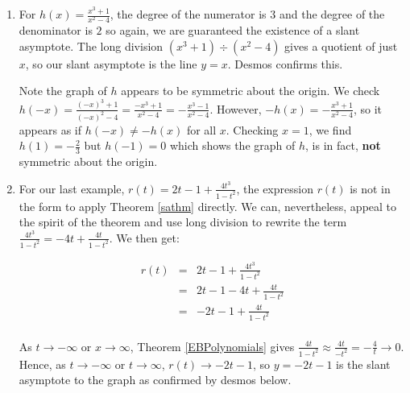 \documentclass{ximera}
\begin{document}
\begin{example}
\begin{explanation}
\begin{enumerate}
so we have that the slant asymptote $y=t+2$ is identical to the graph of $y=g(t)$ except at $t=2$ (where the latter has a `hole' at $(2,4)$.) While the word `asymptote' has the connotation of `approaching but not equaling,' Definitions \ref{ha} and  \ref{sa} allow for these extreme cases.

\begin{center}
\end{center} 

\item   For $h(x) = \frac{x^3+1}{x^2-4}$, the degree of the numerator is $3$ and the degree of the denominator is $2$ so again, we are guaranteed the existence of a slant asymptote.  The long division $\left(x^3+1 \right) \div \left(x^2-4\right)$ gives a quotient of just $x$, so our slant asymptote is the line $y=x$.  Desmos confirms this.  

\begin{center}
\end{center} 


Note the graph of $h$ appears to be symmetric about the origin.  We check $h(-x) = \frac{(-x)^3+1}{(-x)^2-4} = \frac{-x^3+1}{x^2-4} = - \frac{x^3-1}{x^2-4}$.  However, $-h(x) = - \frac{x^3+1}{x^2-4}$, so it appears as if $h(-x) \neq -h(x)$ for all $x$.  Checking $x=1$, we find $h(1) = -\frac{2}{3}$ but $h(-1) = 0$ which shows the graph of $h$, is in fact,  \textbf{not} symmetric about the origin.


\item  For our last example,  $r(t) = 2t-1+\frac{4t^3}{1-t^2}$, the expression $r(t)$ is not in the form to apply Theorem \ref{sathm} directly.  We can, nevertheless, appeal to the spirit of the theorem and use long division to rewrite the term $\frac{4t^3}{1-t^2} = -4t + \frac{4t}{1-t^2}$.  We then get:

 \[ \begin{array}{rcl}
 r(t) & = & 2t-1+\frac{4t^3}{1-t^2} \\
       &= &  2t-1-4t+\frac{4t}{1-t^2} \\
       & = & -2t-1 + \frac{4t}{1-t^2} \\ \end{array}\]
       
As $t \rightarrow -\infty$ or $x \rightarrow \infty$,  Theorem \ref{EBPolynomials} gives  $\frac{4t}{1-t^2} \approx \frac{4t}{-t^2} = -\frac{4}{t} \rightarrow 0$.  Hence, as $t \rightarrow -\infty$ or $t \rightarrow \infty$, $r(t) \rightarrow -2t-1$, so $y = -2t-1$ is the slant asymptote to the graph as confirmed by desmos below.  


\end{enumerate}
\end{explanation}
\end{example}
\end{document}
